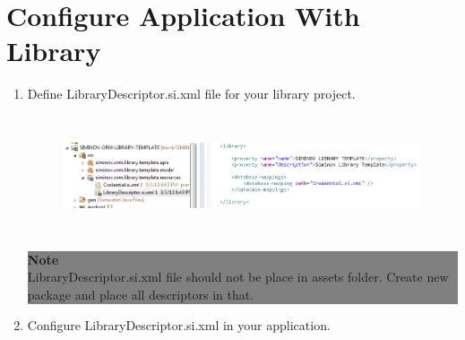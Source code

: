 \newpage
\section{Configure Application With Library}

\begin{enumerate}

	\item \small Define LibraryDescriptor.si.xml file for your library project.
	
		\begin{figure}[!htbp]
			\centering
				\includegraphics[height=3.5cm]{Resources/siminov_library_template_library_descriptor.png}
		\end{figure}

		\begin{center}
			\colorbox{grey}{
			\parbox[t]{.8\linewidth}{
				\fontsize{11pt}{11pt}\selectfont %
				\vspace*{0.1cm} %
		
				\hfill \textbf{Note} \\
					LibraryDescriptor.si.xml file should not be place in assets folder. Create new package and place all descriptors in that.

				\vspace*{0.0cm} %
				}
			}

		\end{center}


	\item \small Configure LibraryDescriptor.si.xml in your application.
			

\end{enumerate}
